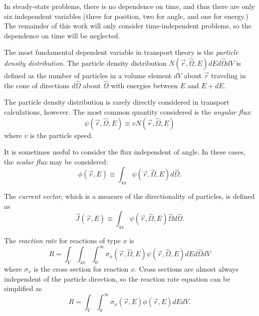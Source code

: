 In steady-state problems, there is no dependence on time, and thus there are only six independent variables (three for position, two for angle, and one for energy.) The remainder of this work will only consider time-independent problems, so the dependence on time will be neglected.

The most fundamental dependent variable in transport theory is the \textit{particle density distribution}.
The particle density distribution $N\left(\vec{r},\hat{\Omega},E\right)dEd\hat{\Omega}dV$ is defined as the number of particles in a volume element $dV$ about $\vec{r}$ traveling in the cone of directions $d\hat{\Omega}$ about $\hat{\Omega}$ with energies between $E$ and $E + dE$.

The particle density distribution is rarely directly considered in transport calculations, however.
The most common quantity considered is the \textit{angular flux}:
\begin{equation}\label{eq:bg:rt:angular-flux}
  \psi\left(\vec{r},\hat{\Omega},E\right) \equiv vN\left(\vec{r},\hat{\Omega},E\right)
\end{equation}
where $v$ is the particle speed.

It is sometimes useful to consider the flux independent of angle.
In these cases, the \textit{scalar flux} may be considered:
\begin{equation}\label{eq:bg:rt:scalar-flux}
  \phi\left(\vec{r},E\right) \equiv \int_{4\pi}\psi\left(\vec{r},\hat{\Omega},E\right)d\hat{\Omega}.
\end{equation}

The \textit{current vector}, which is a measure of the directionality of particles, is defined as
\begin{equation}\label{eq:bg:rt:current-vector}
  \vec{J}\left(\vec{r},E\right) \equiv \int_{4\pi}\psi\left(\vec{r},\hat{\Omega},E\right)\hat{\Omega} d\hat{\Omega}.
\end{equation}

The \textit{reaction rate} for reactions of type $x$ is
\begin{equation}\label{eq:bg:rt:rxn-rate-angular}
  R = \int_V\int_{4\pi}\int_0^\infty\sigma_x\left(\vec{r},\hat{\Omega},E\right)\psi\left(\vec{r},\hat{\Omega},E\right)dEd\hat{\Omega}dV
\end{equation}
where $\sigma_x$ is the cross section for reaction $x$.
Cross sections are almost always independent of the particle direction, so the reaction rate equation can be simplified as
\begin{equation}\label{eq:bg:rt:rxn-rate-scalar}
  R = \int_V\int_0^\infty\sigma_x\left(\vec{r},E\right)\phi\left(\vec{r},E\right)dEdV.
\end{equation}

